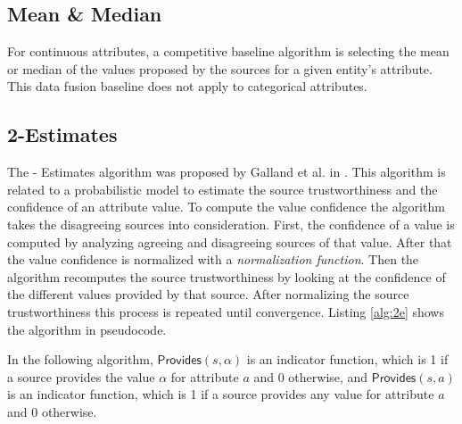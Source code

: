 \documentclass{acm_proc_article-sp}
\begin{document}
\subsection{Mean \& Median}

For continuous attributes, a competitive baseline algorithm is selecting the mean or median of the values proposed by the sources for a given entity's attribute. This data fusion baseline does not apply to categorical attributes. 

\subsection{2-Estimates}
The {- Estimates} algorithm was proposed by Galland et al. in \cite{galland:corro}. This algorithm is related to a probabilistic model to estimate the source trustworthiness and the confidence of an attribute value. To compute the value confidence the algorithm takes the disagreeing sources into consideration. First, the confidence of a value is computed by analyzing agreeing and disagreeing sources of that value. After that the value confidence is normalized with a \emph{normalization function}. Then the algorithm recomputes the source trustworthiness by looking at the confidence of the different values provided by that source. After normalizing the source trustworthiness this process is repeated until convergence. Listing \ref{alg:2e} shows the algorithm in pseudocode.

In the following algorithm, $\mathsf{Provides}(s,\alpha)$ is an indicator function, which is 1 if a source provides the value $\alpha$ for attribute $a$ and 0 otherwise, and $\mathsf{Provides}(s,a)$ is an indicator function, which is 1 if a source provides any value for attribute $a$ and 0 otherwise. 
\end{document}
